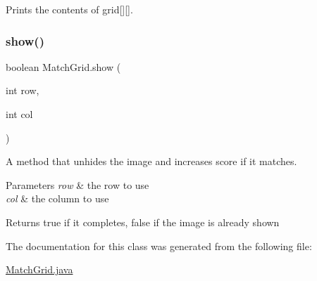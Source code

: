 Prints the contents of grid\mbox{[}\mbox{]}\mbox{[}\mbox{]}. 

\mbox{\label{class_match_grid_adc3b7a588c1b58a737f3ef45a10a7888}} 
\subsubsection{\texorpdfstring{show()}{show()}}
{\footnotesize\ttfamily boolean Match\+Grid.\+show (\begin{DoxyParamCaption}\item[{int}]{row,  }\item[{int}]{col }\end{DoxyParamCaption})}



A method that unhides the image and increases score if it matches. 


\begin{DoxyParams}{Parameters}
{\em row} & the row to use \\
\hline
{\em col} & the column to use \\
\hline
\end{DoxyParams}
\begin{DoxyReturn}{Returns}
true if it completes, false if the image is already shown 
\end{DoxyReturn}


The documentation for this class was generated from the following file\+:\begin{DoxyCompactItemize}
\item 
\mbox{\hyperlink{_match_grid_8java}{Match\+Grid.\+java}}\end{DoxyCompactItemize}
